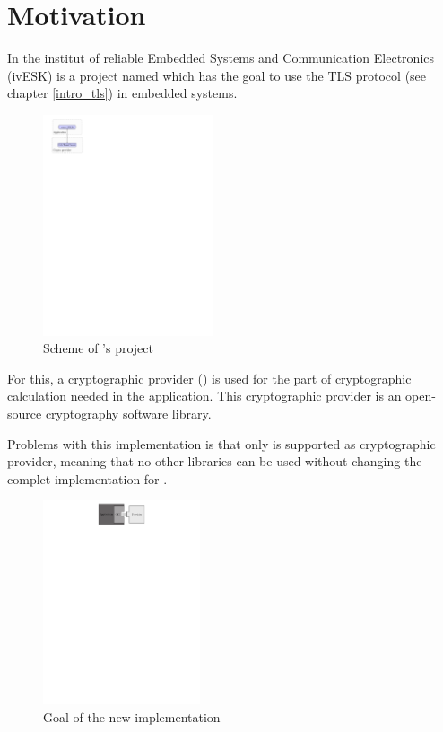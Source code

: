 \chapter{Motivation}

In the institut of reliable Embedded Systems and Communication Electronics
(ivESK) is a project named \embtls which has the goal to use the TLS protocol
(see chapter \ref{intro_tls}) in embedded systems.


\begin{figure}[!ht]
\centering
\includegraphics[trim=0cm 23.25cm 15cm 0cm,
height=6.5cm]{figures/intro_embtls.pdf}
\caption{Scheme of \embtls's project}
\label{fig:motiv_embtls}


\end{figure}

For this, a cryptographic provider (\tomcrypt) is used for the part of
cryptographic calculation needed in the application.\newline
This cryptographic provider is an open-source cryptography software
library.\newline


Problems with this implementation is that only \tomcrypt is
supported as cryptographic provider, meaning that no other libraries can be used
without changing the complet implementation for \embtls. \newline

\newpage

\begin{figure}[!ht]
\centering
\includegraphics[trim=6cm 24.5cm 2cm 0cm, height=6cm]{figures/intro_gci.pdf}
\caption{Goal of the new implementation}
\label{fig:motiv_gci}

\end{figure}

